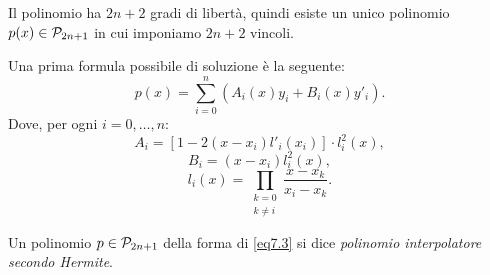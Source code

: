 Il polinomio ha $2n +2$ gradi di libertà, quindi esiste un unico polinomio
$p(x) \in \mathcal{P}_{2n+1}$ in cui imponiamo $2n+2$ vincoli.

Una prima formula possibile di soluzione è la seguente:
\begin{equation}\label{eq7.3}
p(x) = \sum_{i=0}^n\left(A_i(x)y_i + B_i(x)y'_i\right).
\end{equation}
Dove, per ogni $i = 0, \ldots, n$:
\[A_i = [1-2(x-x_i)l'_i(x_i)]\cdot l_i^2(x),\]
\[B_i = (x-x_i)l_i^2(x),\]
\[l_i(x) = \prod_{\substack{k=0 \\ k\neq i}}\frac{x-x_k}{x_i-x_k}.\]

\begin{defi}
Un polinomio $p \in \mathcal{P}_{2n+1}$ della forma di \ref{eq7.3} si dice
\emph{polinomio interpolatore secondo Hermite}.
\end{defi}

